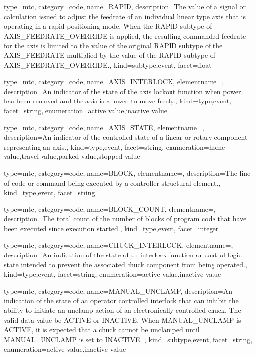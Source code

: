 {
  type=mtc,
  category=code,
  name={RAPID},
  description={The value of a signal or calculation issued to adjust the feedrate of an individual linear type axis that is operating in a rapid positioning mode. \newline When the RAPID subtype of AXIS\_FEEDRATE\_OVERRIDE is applied, the resulting commanded feedrate for the axis is limited to the value of the original RAPID subtype of the AXIS\_FEEDRATE multiplied by the value of the RAPID subtype of AXIS\_FEEDRATE\_OVERRIDE.},
  kind={subtype,event},
  facet={\gls{float}}
}


{
  type=mtc,
  category=code,
  name={AXIS\_INTERLOCK},
  elementname=,
  description={An indicator of the state of the axis lockout function when power has been removed and the axis is allowed to move freely.},
  kind={type,event},
  facet={\gls{string}},
  enumeration={\gls{active value},\gls{inactive value}}
}


{
  type=mtc,
  category=code,
  name={AXIS\_STATE},
  elementname=,
  description={An indicator of the controlled state of a \gls{linear} or \gls{rotary} component representing an axis.},
  kind={type,event},
  facet={\gls{string}},
  enumeration={\gls{home value},\gls{travel value},\gls{parked value},\gls{stopped value}}
}


{
  type=mtc,
  category=code,
  name={BLOCK},
  elementname=,
  description={The line of code or command being executed by a \gls{controller} \gls{structural element}.},
  kind={type,event},
  facet={\gls{string}}
}


{
  type=mtc,
  category=code,
  name={BLOCK\_COUNT},
  elementname=,
  description={The total count of the number of blocks of program code that have been executed since execution started.},
  kind={type,event},
  facet={\gls{integer}}
}


{
  type=mtc,
  category=code,
  name={CHUCK\_INTERLOCK},
  elementname=,
  description={An indication of the state of an interlock function or control logic state intended to prevent the associated \gls{chuck} component from being operated.},
  kind={type,event},
  facet={\gls{string}},
  enumeration={\gls{active value},\gls{inactive value}}
}


{
  type=mtc,
  category=code,
  name={MANUAL\_UNCLAMP},
  description={An indication of the state of an operator controlled interlock that can inhibit the ability to initiate an unclamp action of an electronically controlled chuck.  The \gls{valid data value} \must be ACTIVE or INACTIVE. \newline When MANUAL\_UNCLAMP is ACTIVE, it is expected that a chuck cannot be unclamped until MANUAL\_UNCLAMP is set to INACTIVE. },
  kind={subtype,event},
  facet={\gls{string}},
  enumeration={\gls{active value},\gls{inactive value}}
}


